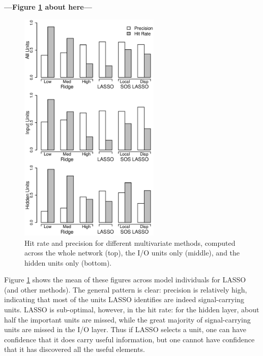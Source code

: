 \begin{center}
\textbf{---Figure \ref{fig.precision} about here---}
\end{center}

\begin{figure}
\centering
\includegraphics[width=0.6\textwidth]{figures/precision_plot.eps}
\caption{\label{fig.precision} Hit rate and precision for different multivariate methods, computed across the whole network (top), the I/O units only (middle), and the hidden units only (bottom).}
\end{figure}

Figure \ref{fig.precision} shows the mean of these figures across model individuals for LASSO (and other methods). The general pattern is clear: precision is relatively high, indicating that most of the units LASSO identifies are indeed signal-carrying units. LASSO is sub-optimal, however, in the hit rate: for the hidden layer, about half the important units are missed, while the great majority of signal-carrying units are missed in the I/O layer. Thus if LASSO selects a unit, one can have confidence that it does carry useful information, but one cannot have confidence that it has discovered all the useful elements.

